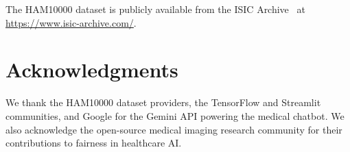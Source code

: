 \documentclass[10pt, twocolumn, letterpaper]{article}
\begin{document}
The HAM10000 dataset is publicly available from the ISIC Archive~\cite{codella2018} at \url{https://www.isic-archive.com/}.

\section*{Acknowledgments}
We thank the HAM10000 dataset providers, the TensorFlow and Streamlit communities, and Google for the Gemini API powering the medical chatbot. We also acknowledge the open-source medical imaging research community for their contributions to fairness in healthcare AI.

\end{document}

